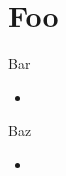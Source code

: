 \section*{Foo}

\begin{frame}{Bar}
    \begin{itemize}
        \item \lipsum[3] \cite{eda}
    \end{itemize}
\end{frame}

\begin{frame}{Baz}
    \begin{itemize}
        \item \lipsum[3]
    \end{itemize}
\end{frame}
